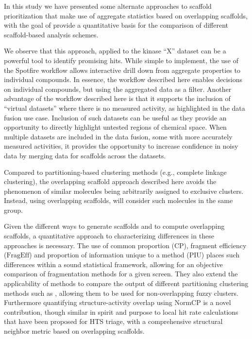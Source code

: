 \documentclass[journal=jacsat,manuscript=article]{achemso}
\begin{document}
In this study we have presented some alternate approaches to scaffold
prioritization that make use of aggregate statistics based on
overlapping scaffolds, with the goal of provide a quantitative basis
for the comparison of different scaffold-based analysis schemes. 

We observe that this approach, applied to the kinase ``X'' dataset can
be a powerful tool to identify promising hits. While simple to implement,
the use of the Spotfire workflow allows interactive drill
down from aggregate properties to individual compounds. In essence,
the workflow described here enables decisions on individual compounds,
but using the aggregated data as a filter. Another advantage of the
workflow described here is that it supports the inclusion of ``virtual
datasets'' where there is no measured activity, as highlighted in the
data fusion use case.  Inclusion of such datasets can be useful as
they provide an opportunity to directly highlight untested regions of
chemical space. When multiple datasets are included in the data fusion, 
some with more accurately measured activities, it provides the opportunity to increase
confidence in noisy data by merging data for scaffolds across the
datasets.

Compared to partitioning-based clustering methods (e.g., complete
linkage clustering), the overlapping scaffold approach described here
avoids the phenomenon of similar molecules being arbitrarily assigned to
exclusive clusters.  Instead, using overlapping scaffolds, will
consider such molecules in the same group.

Given the different ways to generate scaffolds and to compute
overlapping scaffolds, a quantitative approach to characterizing
differences in these approaches is necessary. The use of common
proportion ($\textrm{CP}$), fragment efficiency ($\textrm{FragEff}$)
and proportion of information unique to a method ($\textrm{PIU}$) 
places such differences within a sound statistical framework, allowing
for an objective comparison of fragmentation methods for a given
screen. They also extend the applicability of
methods to compare the output of different partitioning clustering
methods such as \citet{Torres2009}, allowing them to be used for
non-overlapping fuzzy clusters. Furthermore quantifying
structure-activity overlap using $\textrm{NormCP}$ is a novel
contribution, though similar in spirit and purpose to local hit rate
calculations that have been proposed for HTS triage\cite{Posner2009},
with a comprehensive structural neighbor metric based on overlapping
scaffolds.
\end{document}
